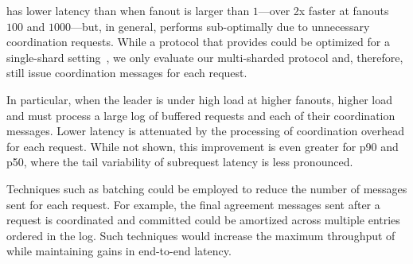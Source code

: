 \system{} has lower latency than \mpaxos{} when fanout is larger than $1$---over 2x
faster at fanouts $100$ and $1000$---but, in general, performs sub-optimally due
to unnecessary coordination requests. While a protocol that provides \mdl could
be optimized for a single-shard setting~\cite{ongaro2014consensus}, we only evaluate
our multi-sharded protocol and, therefore, still issue coordination messages for
each request.

In particular, when the leader is under high load at higher fanouts, higher load
and must process a large log of buffered requests and each of their coordination
messages. Lower latency is attenuated by the processing of coordination overhead
for each request. While not shown, this improvement is even greater for p90 and
p50, where the tail variability of subrequest latency is less pronounced.

Techniques such as batching could be employed to reduce the number of messages
sent for each request. For example, the final agreement messages sent after a
request is coordinated and committed could be amortized across multiple entries
ordered in the log. Such techniques would increase the maximum throughput of
\protocol while maintaining gains in end-to-end latency.

